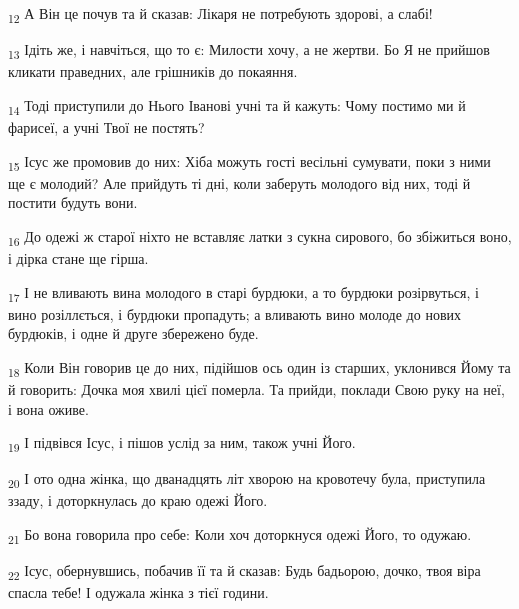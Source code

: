 \begin{tcolorbox}
\textsubscript{12} А Він це почув та й сказав: Лікаря не потребують здорові, а слабі!
\end{tcolorbox}
\begin{tcolorbox}
\textsubscript{13} Ідіть же, і навчіться, що то є: Милости хочу, а не жертви. Бо Я не прийшов кликати праведних, але грішників до покаяння.
\end{tcolorbox}
\begin{tcolorbox}
\textsubscript{14} Тоді приступили до Нього Іванові учні та й кажуть: Чому постимо ми й фарисеї, а учні Твої не постять?
\end{tcolorbox}
\begin{tcolorbox}
\textsubscript{15} Ісус же промовив до них: Хіба можуть гості весільні сумувати, поки з ними ще є молодий? Але прийдуть ті дні, коли заберуть молодого від них, тоді й постити будуть вони.
\end{tcolorbox}
\begin{tcolorbox}
\textsubscript{16} До одежі ж старої ніхто не вставляє латки з сукна сирового, бо збіжиться воно, і дірка стане ще гірша.
\end{tcolorbox}
\begin{tcolorbox}
\textsubscript{17} І не вливають вина молодого в старі бурдюки, а то бурдюки розірвуться, і вино розіллється, і бурдюки пропадуть; а вливають вино молоде до нових бурдюків, і одне й друге збережено буде.
\end{tcolorbox}
\begin{tcolorbox}
\textsubscript{18} Коли Він говорив це до них, підійшов ось один із старших, уклонився Йому та й говорить: Дочка моя хвилі цієї померла. Та прийди, поклади Свою руку на неї, і вона оживе.
\end{tcolorbox}
\begin{tcolorbox}
\textsubscript{19} І підвівся Ісус, і пішов услід за ним, також учні Його.
\end{tcolorbox}
\begin{tcolorbox}
\textsubscript{20} І ото одна жінка, що дванадцять літ хворою на кровотечу була, приступила ззаду, і доторкнулась до краю одежі Його.
\end{tcolorbox}
\begin{tcolorbox}
\textsubscript{21} Бо вона говорила про себе: Коли хоч доторкнуся одежі Його, то одужаю.
\end{tcolorbox}
\begin{tcolorbox}
\textsubscript{22} Ісус, обернувшись, побачив її та й сказав: Будь бадьорою, дочко, твоя віра спасла тебе! І одужала жінка з тієї години.
\end{tcolorbox}
